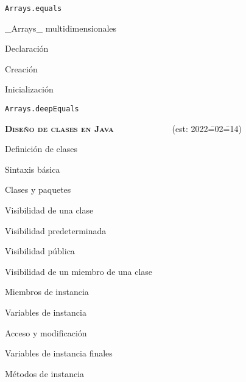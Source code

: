 \begin{longenum}
\begin{longenum}
\begin{longenum}
\begin{longenum}
                \item \texttt{Arrays.equals}
            \end{longenum}
            \item \_Arrays\_ multidimensionales
            \begin{longenum}
                \item Declaración
                \item Creación
                \item Inicialización
                \item \texttt{Arrays.deepEquals}
            \end{longenum}
        \end{longenum}
    \end{longenum}
    \item \textbf{\textsc{Diseño de clases en Java}} \ \ \ \ \ \ \ \ \ \ \ \ \ (est: 2022\==02\==14)
    \begin{longenum}
        \item Definición de clases
        \begin{longenum}
            \item Sintaxis básica
            \item Clases y paquetes
            \item Visibilidad de una clase
            \begin{longenum}
                \item Visibilidad predeterminada
                \item Visibilidad pública
            \end{longenum}
            \item Visibilidad de un miembro de una clase
        \end{longenum}
        \item Miembros de instancia
        \begin{longenum}
            \item Variables de instancia
            \begin{longenum}
                \item Acceso y modificación
                \item Variables de instancia finales
            \end{longenum}
            \item Métodos de instancia
            \begin{longenum}

\end{longenum}
\end{longenum}
\end{longenum}
\end{longenum}
